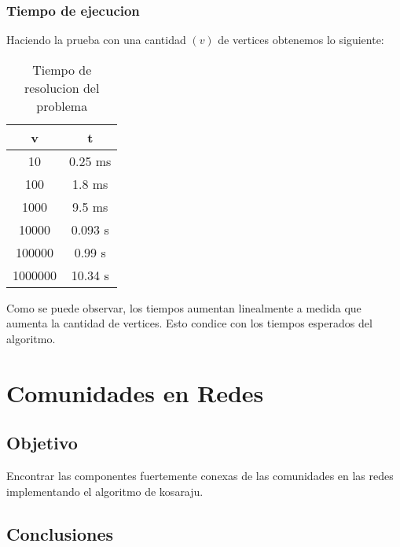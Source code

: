 \documentclass{article}
\begin{document}
            \subsubsection{Tiempo de ejecucion}
                Haciendo la prueba con una cantidad $(v)$ de vertices obtenemos lo siguiente:
                \begin{table}[h!]
                    \centering
                    \caption{Tiempo de resolucion del problema}
                    \begin{tabular}{c|c}
                        v & t \\
                        \hline
                        10 & 0.25 ms \\
                        \hline
                        100 & 1.8 ms \\
                        \hline
                        1000 & 9.5 ms \\
                        \hline
                        10000 & 0.093 s \\
                        \hline
                        100000 & 0.99 s \\
                        \hline
                        1000000 & 10.34 s
                    \end{tabular}
                \end{table}

                Como se puede observar, los tiempos aumentan linealmente a medida
                que aumenta la cantidad de vertices. Esto condice con los tiempos
                esperados del algoritmo.


    \section{Comunidades en Redes}
        \subsection{Objetivo}
          Encontrar las componentes fuertemente conexas de las comunidades en las
          redes implementando el algoritmo de kosaraju.
        \subsection{Conclusiones}
\end{document}
